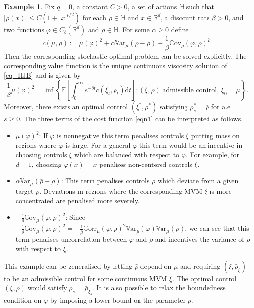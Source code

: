 \documentclass{article}
\theoremstyle{definition}
\newtheorem{example}[theorem]{\textbf{Example}}
\numberwithin{equation}{section}
\numberwithin{theorem}{section}
\newcommand{\E}{\mathbb{E}}
\newcommand{\R}{\mathbb{R}}
\newcommand{\dt}{\mathrm{d}t}
\newcommand{\Hb}{\mathbb{H}}
\newcommand{\Cov}{\mathbb{C}\mathrm{ov}}
\newcommand{\Var}{\mathbb{V}\mathrm{ar}}
\newcommand{\Corr}{\mathbb{C}\mathrm{orr}}
\begin{document}
\begin{example}\label{ex91}
Fix $q=0$, a constant $C>0$, a set of actions $\Hb$ such that $|\rho(x)|\leq C(1+|x|^{p/2})$ for each $\rho\in\Hb$ and $x\in {\R^d}$,
a discount rate $\beta>0$, and  two functions $\varphi \in C_b({\R^d})$ and $\bar\rho\in\Hb$.
 For some $\alpha\geq0$ define
\begin{equation}\label{eqn1}
c(\mu,\rho):=\mu(\varphi )^2+\alpha\Var_\mu(\bar\rho-\rho)-\frac 1 \beta \Cov_\mu(\varphi ,\rho)^2.
\end{equation}
Then the corresponding stochastic optimal problem can be solved explicitly. The corresponding value function is  the unique continuous viscosity solution of \eqref{eq_HJB} and is given by
$$
\frac 1 \beta \mu(\varphi )^2 
=\inf\left\{  \E\left[ \int_0^\infty e^{-\beta t} c(\xi_t,\rho_t) \dt \right] \colon \text{$(\xi,\rho)$ admissible control, $\xi_0=\mu$}\right\}.
$$
Moreover, there exists an optimal control $(\xi^*,\rho^*)$ satisfying $\rho_s^*=\bar\rho$ for a.e.~$s\geq 0$. 
%
The three terms of the cost function \eqref{eqn1} can be interpreted as follows.
\begin{itemize}
\item $\mu(\varphi)^2$: If $\varphi $ is nonnegative this term penalises controls $\xi$ putting mass on regions where $\varphi $ is large. For a general $\varphi $ this term would be an incentive in choosing controls $\xi$ which are balanced with respect to $\varphi $. For example, for $d=1$, choosing $\varphi (x)=x$  penalises non-centered controls $\xi$.
\item $\alpha\Var_\mu(\bar\rho-\rho)$: This term penalises controls $\rho$ which deviate from a given target $\bar\rho$. Deviations in regions where the corresponding MVM $\xi$ is more concentrated are penalised more severely.
\item $-\frac 1 \beta \Cov_\mu(\varphi ,\rho)^2$: Since $-\frac 1 \beta \Cov_\mu(\varphi ,\rho)^2=-\frac 1 \beta \Corr_\mu(\varphi ,\rho)^2\Var_\mu(\varphi )\Var_\mu(\rho)$, we can see that this term penalises uncorrelation between $\varphi $ and $\rho$  and incentives the variance of $\rho$ with respect to $\xi$.
\end{itemize}



This example can be generalised by letting $\bar\rho$ depend on $\mu$ and requiring  $(\xi, \bar\rho_\xi)$ to be an admissible control for some continuous MVM $\xi$. The optimal control $(\xi,\rho)$ would satisfy $\rho_s=\bar\rho_{\xi_s}$. It is also possible to relax the boundedness condition on $\varphi $ by imposing a lower bound on the parameter $p$. 
\end{example}
\end{document}
